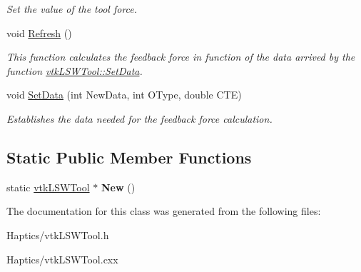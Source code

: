 \begin{DoxyCompactItemize}
\begin{DoxyCompactList}\small\item\em Set the value of the tool force. \item\end{DoxyCompactList}\item 
\hypertarget{classvtkLSWTool_ad3ca7acbc190b0d67efd5406a9f64671}{
void \hyperlink{classvtkLSWTool_ad3ca7acbc190b0d67efd5406a9f64671}{Refresh} ()}
\label{classvtkLSWTool_ad3ca7acbc190b0d67efd5406a9f64671}

\begin{DoxyCompactList}\small\item\em This function calculates the feedback force in function of the data arrived by the function \hyperlink{classvtkLSWTool_a8260d105dc4903f885a3d794842372a5}{vtkLSWTool::SetData}. \item\end{DoxyCompactList}\item 
\hypertarget{classvtkLSWTool_a8260d105dc4903f885a3d794842372a5}{
void \hyperlink{classvtkLSWTool_a8260d105dc4903f885a3d794842372a5}{SetData} (int NewData, int OType, double CTE)}
\label{classvtkLSWTool_a8260d105dc4903f885a3d794842372a5}

\begin{DoxyCompactList}\small\item\em Establishes the data needed for the feedback force calculation. \item\end{DoxyCompactList}\end{DoxyCompactItemize}
\subsection*{Static Public Member Functions}
\begin{DoxyCompactItemize}
\item 
\hypertarget{classvtkLSWTool_a52925ce9f94d194f51fbcff8c3655db5}{
static \hyperlink{classvtkLSWTool}{vtkLSWTool} $\ast$ {\bfseries New} ()}
\label{classvtkLSWTool_a52925ce9f94d194f51fbcff8c3655db5}

\end{DoxyCompactItemize}


The documentation for this class was generated from the following files:\begin{DoxyCompactItemize}
\item 
Haptics/vtkLSWTool.h\item 
Haptics/vtkLSWTool.cxx\end{DoxyCompactItemize}
